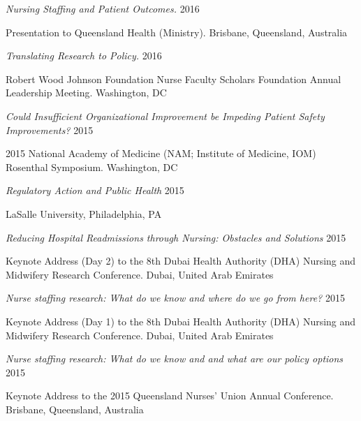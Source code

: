 \documentclass[10pt,]{article}
\begin{document}
{{{{{{{{{{{{{{\begin{hangparas}{.5in}{1}
{\textit {Nursing Staffing and Patient Outcomes.}} \hfill 2016 
\vspace{-2.5mm}
\begin{adjustwidth}{0.5cm}{1cm}
Presentation to Queensland Health (Ministry). Brisbane, Queensland, Australia
\end{adjustwidth}

{\textit {Translating Research to Policy.}} \hfill 2016 
\vspace{-2.5mm}
\begin{adjustwidth}{0.5cm}{1cm}
Robert Wood Johnson Foundation Nurse Faculty Scholars Foundation Annual Leadership Meeting. Washington, DC
\end{adjustwidth}

 {\textit {Could Insufficient Organizational Improvement be Impeding Patient Safety Improvements?}} \hfill 2015 
\vspace{-2.5mm}
\begin{adjustwidth}{0.5cm}{1cm}
2015 National Academy of Medicine (NAM; Institute of Medicine, IOM) Rosenthal Symposium. Washington, DC
\end{adjustwidth}

{\textit {Regulatory Action and Public Health}} \hfill 2015 
\vspace{-2.5mm}
\begin{adjustwidth}{0.5cm}{1cm}
LaSalle University, Philadelphia, PA
\end{adjustwidth}

{\textit {Reducing Hospital Readmissions through Nursing: Obstacles and Solutions}} \hfill 2015 
\vspace{-2.5mm}
\begin{adjustwidth}{0.5cm}{1cm}
Keynote Address (Day 2) to the 8th Dubai Health Authority (DHA) Nursing and Midwifery Research Conference. Dubai, United Arab Emirates
\end{adjustwidth}

{\textit {Nurse staffing research: What do we know and where do we go from here?}} \hfill 2015 
\vspace{-2.5mm}
\begin{adjustwidth}{0.5cm}{1cm}
Keynote Address (Day 1) to the 8th Dubai Health Authority (DHA) Nursing and Midwifery Research Conference. Dubai, United Arab Emirates
\end{adjustwidth}

{\textit {Nurse staffing research: What do we know and and what are our policy options}} \hfill 2015 
\vspace{-2.5mm}
\begin{adjustwidth}{0.5cm}{1cm}
Keynote Address to the 2015 Queensland Nurses’ Union Annual Conference. Brisbane, Queensland, Australia
\end{adjustwidth}


\end{hangparas}}}}}}}}}}}}}}}
\end{document}
